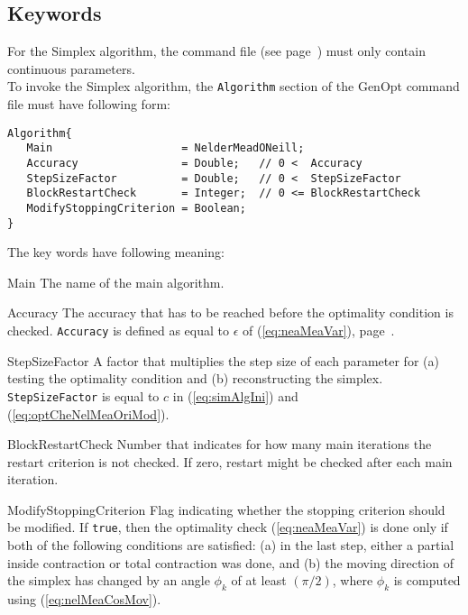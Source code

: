 \subsection{Keywords}
For the Simplex algorithm, the command file (see page~\pageref{par:comFil}) must only contain continuous parameters.\\

To invoke the Simplex algorithm, the \texttt{Algorithm} section of the GenOpt command file must 
have following form:
\begin{lstlisting}
Algorithm{
   Main                    = NelderMeadONeill;
   Accuracy                = Double;   // 0 <  Accuracy
   StepSizeFactor          = Double;   // 0 <  StepSizeFactor
   BlockRestartCheck       = Integer;  // 0 <= BlockRestartCheck
   ModifyStoppingCriterion = Boolean;
}
\end{lstlisting}

\noindent The key words have following meaning:
\begin{codedescription}
\item[Main]
   The name of the main algorithm.
\item[Accuracy]
The accuracy that has to be reached before the optimality condition is checked. \texttt{Accuracy} is 
defined as equal to $\epsilon$ of (\ref{eq:neaMeaVar}), page~\pageref{eq:neaMeaVar}.

\item[StepSizeFactor]
A factor that multiplies the step size of each parameter for 
(a) testing the optimality condition and 
(b) reconstructing the simplex.
\texttt{StepSizeFactor} is equal to $c$ in 
(\ref{eq:simAlgIni}) and (\ref{eq:optCheNelMeaOriMod}).

\item[BlockRestartCheck]
Number that indicates for how many main iterations the restart criterion is not checked. If zero, restart 
might be checked after each main iteration.

\item[ModifyStoppingCriterion]
Flag indicating whether the stopping criterion should be modified. 
If \texttt{true}, then the optimality check 
(\ref{eq:neaMeaVar}) is done only if both of the following conditions are satisfied: 
(a) in the last step, either a partial inside contraction or total contraction was done, and 
(b) the moving direction of the simplex has changed by an angle $\phi_k$ of at least $(\pi/2)$, 
where $\phi_k$ is computed using (\ref{eq:nelMeaCosMov}).
\end{codedescription}


